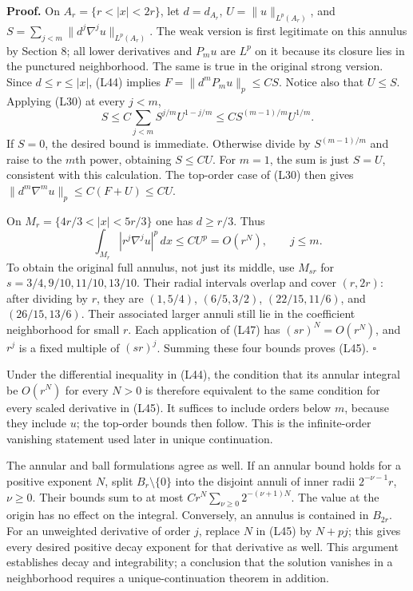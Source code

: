 \documentclass[
  11pt,
]{article}
\begin{document}
\textbf{Proof.} On \(A_r=\{r<|x|<2r\}\), let \(d=d_{A_r}\),
\(U=\|u\|_{L^p(A_r)}\), and
\(S=\sum_{j<m}\|d^j\nabla^j u\|_{L^p(A_r)}\). The weak version is first
legitimate on this annulus by Section 8; all lower derivatives and
\(P_mu\) are \(L^p\) on it because its closure lies in the punctured
neighborhood. The same is true in the original strong version. Since
\(d\leq r\leq|x|\), (L44) implies \(F=\|d^mP_mu\|_p\leq C S\). Notice
also that \(U\leq S\). Applying (L30) at every \(j<m\), \[
S\leq C\sum_{j<m}S^{j/m}U^{1-j/m}
\leq C S^{(m-1)/m}U^{1/m}.                                      \tag{L46}
\] If \(S=0\), the desired bound is immediate. Otherwise divide by
\(S^{(m-1)/m}\) and raise to the \(m\)th power, obtaining \(S\leq CU\).
For \(m=1\), the sum is just \(S=U\), consistent with this calculation.
The top-order case of (L30) then gives
\(\|d^m\nabla^m u\|_p\leq C(F+U)\leq CU\).

On \(M_r=\{4r/3<|x|<5r/3\}\) one has \(d\geq r/3\). Thus \[
\int_{M_r}|r^j\nabla^j u|^p\,dx\leq C U^p=O(r^N),\qquad j\leq m.
                                                                    \tag{L47}
\] To obtain the original full annulus, not just its middle, use
\(M_{s r}\) for \(s=3/4,9/10,11/10,13/10\). Their radial intervals
overlap and cover \((r,2r)\): after dividing by \(r\), they are
\((1,5/4)\), \((6/5,3/2)\), \((22/15,11/6)\), and \((26/15,13/6)\).
Their associated larger annuli still lie in the coefficient neighborhood
for small \(r\). Each application of (L47) has \((sr)^N=O(r^N)\), and
\(r^j\) is a fixed multiple of \((sr)^j\). Summing these four bounds
proves (L45). \(\square\)

Under the differential inequality in (L44), the condition that its
annular integral be \(O(r^N)\) for every \(N>0\) is therefore equivalent
to the same condition for every scaled derivative in (L45). It suffices
to include orders below \(m\), because they include \(u\); the top-order
bounds then follow. This is the infinite-order vanishing statement used
later in unique continuation.

The annular and ball formulations agree as well. If an annular bound
holds for a positive exponent \(N\), split \(B_r\setminus\{0\}\) into
the disjoint annuli of inner radii \(2^{-\nu-1}r\), \(\nu\geq0\). Their
bounds sum to at most \(C r^N\sum_{\nu\geq0}2^{-(\nu+1)N}\). The value
at the origin has no effect on the integral. Conversely, an annulus is
contained in \(B_{2r}\). For an unweighted derivative of order \(j\),
replace \(N\) in (L45) by \(N+pj\); this gives every desired positive
decay exponent for that derivative as well. This argument establishes
decay and integrability; a conclusion that the solution vanishes in a
neighborhood requires a unique-continuation theorem in addition.
\end{document}
